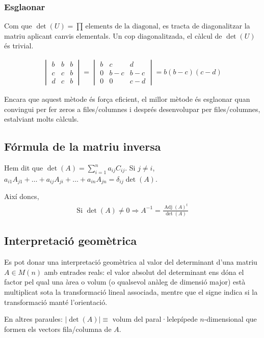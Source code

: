 \subsubsection*{Esglaonar}
Com que $\det (U) = \prod \, \text{elements de la diagonal}$, es tracta de diagonalitzar la matriu aplicant canvis elementals. Un cop diagonalitzada, el càlcul de $\det(U)$ és trivial.
\begin{example}
\begin{align*}
    \begin{vmatrix} b & b & b \\ c & c & b \\ d & c & b \end{vmatrix} = \begin{vmatrix} b & c & d \\ 0 & b-c & b-c \\ 0 & 0 & c-d \end{vmatrix} = b (b - c) (c - d)
\end{align*}
\end{example}

Encara que aquest mètode és força eficient, el millor mètode és esglaonar quan convingui per fer zeros a files/columnes i després desenvolupar per files/columnes, estalviant molts càlculs.

\subsection{Fórmula de la matriu inversa}
Hem dit que $\det(A) = \sum\limits_{i=1}^n a_{ij} C_{ij}$. Si $j \neq i$, $a_{i1} A_{j1} + \dots + a_{ij} A_{ji} + \dots + a_{in} A_{jn} = \delta_{ij} \det (A)$.

Així doncs,
\begin{align}
    \text{Si } \det(A) \neq 0 \Rightarrow A^{-1} = \frac{\operatorname{Adj}(A)^{t}}{\det(A)}
\end{align}
\subsection{Interpretació geomètrica}
Es pot donar una interpretació geomètrica al valor del determinant d'una matriu $A \in M(n)$ amb entrades reals: el valor absolut del determinant ens dóna el factor pel qual una àrea o volum (o qualsevol anàleg de dimensió major) està multiplicat sota la transformació lineal associada, mentre que el signe indica si la transformació manté l'orientació.

En altres paraules: $|\det(A)| \equiv$ volum del paral·lelepípede $n$-dimensional que formen els vectors fila/columna de $A$.
